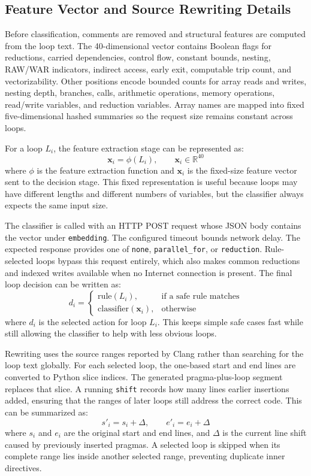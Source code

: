 \documentclass[12pt,a4paper,oneside]{report}
\begin{document}
\subsection{Feature Vector and Source Rewriting Details}

Before classification, comments are removed and structural features are
computed from the loop text. The 40-dimensional vector contains Boolean flags
for reductions, carried dependencies, control flow, constant bounds, nesting,
RAW/WAR indicators, indirect access, early exit, computable trip count, and
vectorizability. Other positions encode bounded counts for array reads and
writes, nesting depth, branches, calls, arithmetic operations, memory
operations, read/write variables, and reduction variables. Array names are
mapped into fixed five-dimensional hashed summaries so the request size remains
constant across loops.

For a loop \(L_i\), the feature extraction stage can be represented as:
\[
\mathbf{x}_i = \phi(L_i), \qquad \mathbf{x}_i \in \mathbb{R}^{40}
\]
where \(\phi\) is the feature extraction function and \(\mathbf{x}_i\) is the
fixed-size feature vector sent to the decision stage. This fixed representation
is useful because loops may have different lengths and different numbers of
variables, but the classifier always expects the same input size.

The classifier is called with an HTTP POST request whose JSON body contains the
vector under \texttt{embedding}. The configured timeout bounds network delay.
The expected response provides one of \texttt{none},
\texttt{parallel\_for}, or \texttt{reduction}. Rule-selected loops bypass this
request entirely, which also makes common reductions and indexed writes
available when no Internet connection is present. The final loop decision can be
written as:
\[
d_i =
\begin{cases}
\text{rule}(L_i), & \text{if a safe rule matches} \\
\text{classifier}(\mathbf{x}_i), & \text{otherwise}
\end{cases}
\]
where \(d_i\) is the selected action for loop \(L_i\). This keeps simple safe
cases fast while still allowing the classifier to help with less obvious loops.

Rewriting uses the source ranges reported by Clang rather than searching for the
loop text globally. For each selected loop, the one-based start and end lines are
converted to Python slice indices. The generated pragma-plus-loop segment
replaces that slice. A running \texttt{shift} records how many lines earlier
insertions added, ensuring that the ranges of later loops still address the
correct code. This can be summarized as:
\[
s'_i = s_i + \Delta, \qquad e'_i = e_i + \Delta
\]
where \(s_i\) and \(e_i\) are the original start and end lines, and \(\Delta\)
is the current line shift caused by previously inserted pragmas. A selected loop
is skipped when its complete range lies inside another selected range,
preventing duplicate inner directives.
\end{document}
